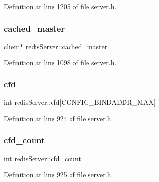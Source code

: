 Definition at line \hyperlink{server_8h_source_l01205}{1205} of file \hyperlink{server_8h_source}{server.\+h}.

\mbox{\label{structredisServer_a3d36af8315a1597be638ef6767db3e46}} 
\subsubsection{\texorpdfstring{cached\+\_\+master}{cached\_master}}
{\footnotesize\ttfamily \hyperlink{structclient}{client}$\ast$ redis\+Server\+::cached\+\_\+master}



Definition at line \hyperlink{server_8h_source_l01098}{1098} of file \hyperlink{server_8h_source}{server.\+h}.

\mbox{\label{structredisServer_a2c6960776f67b3e6ea48528be515d79f}} 
\subsubsection{\texorpdfstring{cfd}{cfd}}
{\footnotesize\ttfamily int redis\+Server\+::cfd\mbox{[}C\+O\+N\+F\+I\+G\+\_\+\+B\+I\+N\+D\+A\+D\+D\+R\+\_\+\+M\+AX\mbox{]}}



Definition at line \hyperlink{server_8h_source_l00924}{924} of file \hyperlink{server_8h_source}{server.\+h}.

\mbox{\label{structredisServer_a22bd95f9f4c56a214a5a00bc003c6ae6}} 
\subsubsection{\texorpdfstring{cfd\+\_\+count}{cfd\_count}}
{\footnotesize\ttfamily int redis\+Server\+::cfd\+\_\+count}



Definition at line \hyperlink{server_8h_source_l00925}{925} of file \hyperlink{server_8h_source}{server.\+h}.

\mbox{\label{structredisServer_a331929ed01b4a905788da0480f281bb7}} 

